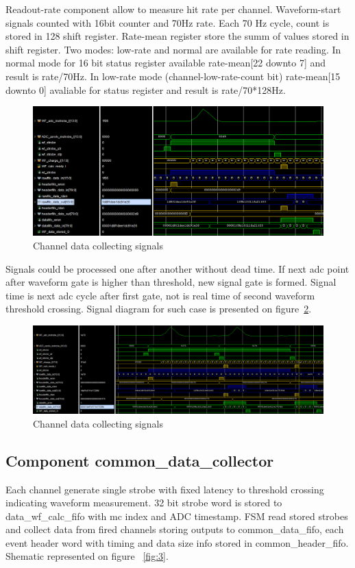 \documentclass{article}
\begin{document}
Readout-rate component allow to measure hit rate per channel. Waveform-start signals counted with 16bit counter and 70Hz rate. Each 70 Hz cycle, count is stored in 128 shift register. Rate-mean register store the summ of values stored in shift register. Two modes: low-rate and normal are available for rate reading. In normal mode for 16 bit status register available rate-mean[22 downto 7] and result is rate/70Hz. In low-rate mode (channel-low-rate-count bit) rate-mean[15 downto 0] avaliable for status register and result is rate/70*128Hz.

\begin{figure}[H]
	\centering 
	\includegraphics[width=1.0\textwidth]{ADC_ch_data_collector_wave.png}
	\caption{\label{fig:4} Channel data collecting signals}
\end{figure}

Signals could be processed one after another without dead time. If next adc point after waveform gate is higher than threshold, new signal gate is formed. Signal time is next adc cycle after first gate, not is real time of second waveform threshold crossing. Signal diagram for such case is presented on figure~\ref{fig:5}.


\begin{figure}[H]
	\centering 
	\includegraphics[width=1.0\textwidth]{ADC_ch_data_collector_wave_pileup.png}
	\caption{\label{fig:5} Channel data collecting signals}
\end{figure}

\subsection{Component common\_data\_collector}
Each channel generate single strobe with fixed latency to threshold crossing indicating waveform measurement. 32 bit strobe word is stored to data\_wf\_calc\_fifo with mc index and ADC timestamp. FSM read stored strobes and collect data from fired channels storing outputs to common\_data\_fifo, each event header word with timing and data size info stored in common\_header\_fifo. Shematic represented on figure ~\ref{fig:3}.
\end{document}
